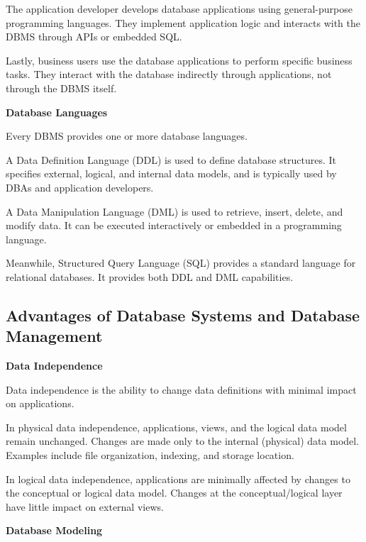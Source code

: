 \documentclass[11pt]{article}
\begin{document}
The application developer develops database applications using general-purpose programming languages. They implement application logic and interacts with the DBMS through APIs or embedded SQL.

Lastly, business users use the database applications to perform specific business tasks. They interact with the database indirectly through applications, not through the DBMS itself.

\vspace{11pt}
\textbf{Database Languages}
\vspace{11pt}

Every DBMS provides one or more database languages.

A Data Definition Language (DDL) is used to define database structures. It specifies external, logical, and internal data models, and is typically used by DBAs and application developers.

A Data Manipulation Language (DML) is used to retrieve, insert, delete, and modify data. It can be executed interactively or embedded in a programming language.

Meanwhile, Structured Query Language (SQL) provides a standard language for relational databases. It provides both DDL and DML capabilities.

\vspace{11pt}
\subsection{Advantages of Database Systems and Database Management}
\vspace{11pt}

\vspace{11pt}
\textbf{Data Independence}
\vspace{11pt}

Data independence is the ability to change data definitions with minimal impact on applications.

In physical data independence, applications, views, and the logical data model remain unchanged. Changes are made only to the internal (physical) data model. Examples include file organization, indexing, and storage location.

In logical data independence, applications are minimally affected by changes to the conceptual or logical data model. Changes at the conceptual/logical layer have little impact on external views.

\vspace{11pt}
\textbf{Database Modeling}
\vspace{11pt}
\end{document}
